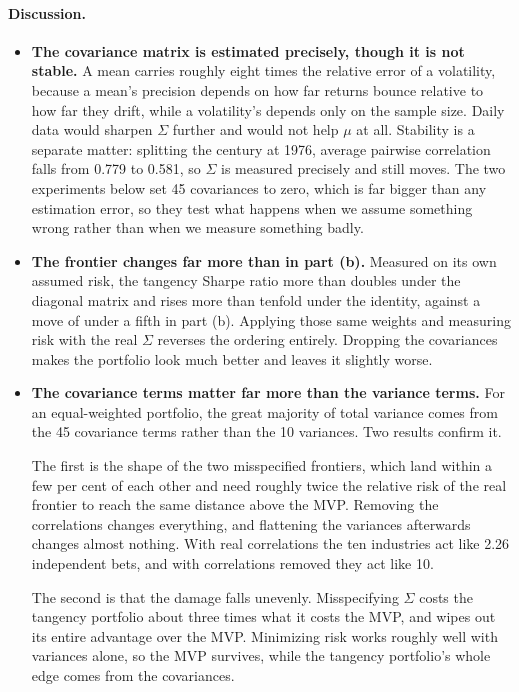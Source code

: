\documentclass[11pt]{article}
\begin{document}
\paragraph{Discussion.}
\begin{itemize}
\setlength{\itemsep}{3pt}\setlength{\parskip}{0pt}

\item \textbf{The covariance matrix is estimated precisely, though it is not
stable.} A mean carries roughly eight times the relative error of a
volatility, because a mean's precision depends on how far returns bounce
relative to how far they drift, while a volatility's depends only on the
sample size. Daily data would sharpen $\Sigma$ further and would not help
$\mu$ at all. Stability is a separate matter: splitting the century at 1976,
average pairwise correlation falls from 0.779 to 0.581, so $\Sigma$ is
measured precisely and still moves. The two experiments below set 45
covariances to zero, which is far bigger than any estimation error, so they
test what happens when we assume something wrong rather than when we measure
something badly.

\item \textbf{The frontier changes far more than in part (b).} Measured on its
own assumed risk, the tangency Sharpe ratio more than doubles under the
diagonal matrix and rises more than tenfold under the identity, against a move
of under a fifth in part (b). Applying those same weights and measuring risk
with the real $\Sigma$ reverses the ordering entirely. Dropping the
covariances makes the portfolio look much better and leaves it slightly worse.

\item \textbf{The covariance terms matter far more than the variance terms.}
For an equal-weighted portfolio, the great majority of total variance comes
from the 45 covariance terms rather than the 10 variances. Two results confirm
it.

The first is the shape of the two misspecified frontiers, which land within a
few per cent of each other and need roughly twice the relative risk of the
real frontier to reach the same distance above the MVP. Removing the
correlations changes everything, and flattening the variances afterwards
changes almost nothing. With real correlations the ten industries act like
2.26 independent bets, and with correlations removed they act like 10.

The second is that the damage falls unevenly. Misspecifying $\Sigma$ costs the
tangency portfolio about three times what it costs the MVP, and wipes out its
entire advantage over the MVP. Minimizing risk works roughly well with
variances alone, so the MVP survives, while the tangency portfolio's whole
edge comes from the covariances.

\end{itemize}
\end{document}

